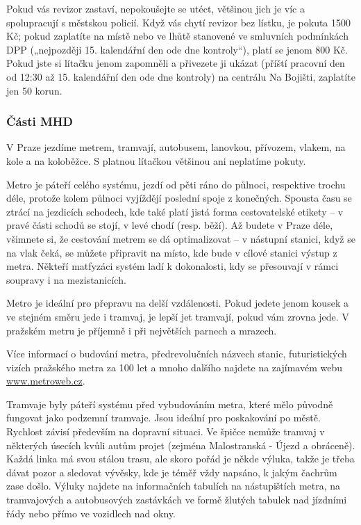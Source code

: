 Pokud vás revizor zastaví, nepokoušejte se utéct, většinou jich je víc a
spolupracují s městskou policií. Když vás chytí revizor bez lístku, je pokuta
1500 Kč; pokud zaplatíte na místě nebo ve lhůtě stanovené ve smluvních
podmínkách DPP („nejpozději 15. kalendářní den ode dne kontroly“), platí se
jenom 800 Kč. Pokud jste si lítačku jenom zapomněli a přivezete ji ukázat
(příští pracovní den od 12:30 až 15. kalendářní den ode dne kontroly) na
centrálu Na Bojišti, zaplatíte jen 50 korun.


\subsubsection{Části MHD}
V Praze jezdíme metrem, tramvají, autobusem, lanovkou, přívozem, vlakem, na kole
a na koloběžce. S platnou lítačkou většinou ani neplatíme pokuty.

Metro je páteří celého systému, jezdí od pěti ráno do půlnoci, respektive trochu
déle, protože kolem půlnoci vyjíždějí poslední spoje z konečných. Spousta času
se ztrácí na jezdicích schodech, kde také platí jistá forma cestovatelské
etikety – v pravé části schodů se stojí, v levé chodí (resp. běží). Až budete v
Praze déle, všimnete si, že cestování metrem se dá optimalizovat – v nástupní
stanici, když se na vlak čeká, se můžete připravit na místo, kde bude v cílové
stanici výstup z metra. Někteří matfyzáci systém ladí k dokonalosti, kdy se
přesouvají v rámci soupravy i na mezistanicích.

Metro je ideální pro přepravu na delší vzdálenosti. Pokud jedete jenom kousek a
ve stejném směru jede i tramvaj, je lepší jet tramvají, pokud vám zrovna jede. V
pražském metru je příjemně i při největších parnech a mrazech.

Více informací o budování metra, předrevolučních názvech stanic, futuristických
vizích pražského metra za 100 let a mnoho dalšího najdete na zajímavém webu
\url{www.metroweb.cz}.

Tramvaje byly páteří systému před vybudováním metra, které mělo původně fungovat
jako podzemní tramvaje. Jsou ideální pro poskakování po městě. Rychlost závisí
především na dopravní situaci. Ve špičce nemůže tramvaj v některých úsecích
kvůli autům projet (zejména Malostranská - Újezd a obráceně). Každá linka má
svou stálou trasu, ale skoro pořád je někde výluka, takže je třeba dávat pozor a
sledovat vývěsky, kde je téměř vždy napsáno, k jakým čachrům zase došlo. Výluky
najdete na informačních tabulích na nástupištích metra, na tramvajových a
autobusových zastávkách ve formě žlutých tabulek nad jízdními řády nebo přímo ve
vozidlech nad okny.

